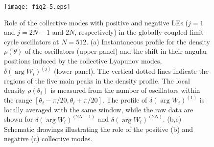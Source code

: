 \documentclass[12pt]{iopart}
\begin{document}
\begin{figure}[t]
  \texttt{[image: fig2-5.eps]}
  \caption{Role of the collective modes with positive and negative LEs ($j=1$ and $j = 2N-1$ and $2N$, respectively) in the globally-coupled limit-cycle oscillators  at $N=512$. (a) Instantaneous profile for the density $\rho(\theta)$ of the oscillators (upper panel) and the shift in their angular positions induced by the collective Lyapunov modes, $\delta(\arg W_i)^{(j)}$ (lower panel). The vertical dotted lines indicate the regions of the five main peaks in the density profile. The local density $\rho(\theta_i)$ is measured from the number of oscillators within the range $[\theta_i - \pi/20, \theta_i+\pi/20]$. The profile of $\delta(\arg W_i)^{(1)}$ is locally averaged with the same window, while the raw data are shown for $\delta(\arg W_i)^{(2N-1)}$ and $\delta(\arg W_i)^{(2N)}$. (b,c) Schematic drawings illustrating the role of the positive (b) and negative (c) collective modes.}
  \label{fig:2-5}
\end{figure}%
\end{document}
